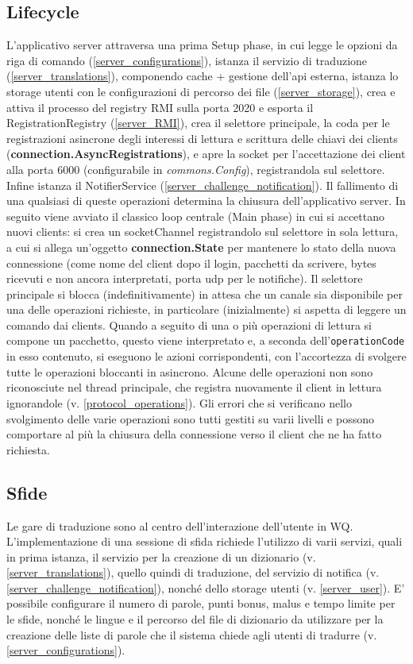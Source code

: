 \documentclass{article}
\begin{document}
    \subsection{Lifecycle}\label{server_lifecycle} L'applicativo server attraversa una prima Setup phase, in cui legge le opzioni da riga di comando (\ref{server_configurations}), istanza il servizio di traduzione (\ref{server_translations}), componendo cache + gestione dell'api esterna, istanza lo storage utenti con le configurazioni di percorso dei file (\ref{server_storage}), crea e attiva il processo del registry RMI sulla porta 2020 e esporta il RegistrationRegistry (\ref{server_RMI}), crea il selettore principale, la coda per le registrazioni asincrone degli interessi di lettura e scrittura delle chiavi dei clients (\textbf{connection.AsyncRegistrations}), e apre la socket per l'accettazione dei client alla porta 6000 (configurabile in \textit{commons.Config}), registrandola sul selettore. Infine istanza il NotifierService (\ref{server_challenge_notification}). Il fallimento di una qualsiasi di queste operazioni determina la chiusura dell'applicativo server.
    \newline In seguito viene avviato il classico loop centrale (Main phase) in cui si accettano nuovi clients: si crea un socketChannel registrandolo sul selettore in sola lettura, a cui si allega un'oggetto \textbf{connection.State} per mantenere lo stato della nuova connessione (come nome del client dopo il login, pacchetti da scrivere, bytes ricevuti e non ancora interpretati, porta udp per le notifiche). Il selettore principale si blocca (indefinitivamente) in attesa che un canale sia disponibile per una delle operazioni richieste, in particolare (inizialmente) si aspetta di leggere un comando dai clients. Quando a seguito di una o più operazioni di lettura si compone un pacchetto, questo viene interpretato e, a seconda dell'\texttt{operationCode} in esso contenuto, si eseguono le azioni corrispondenti, con l'accortezza di svolgere tutte le operazioni bloccanti in asincrono. Alcune delle operazioni non sono riconosciute nel thread principale, che registra nuovamente il client in lettura ignorandole (v. \ref{protocol_operations}). Gli errori che si verificano nello svolgimento delle varie operazioni sono tutti gestiti su varii livelli e possono comportare al più la chiusura della connessione verso il client che ne ha fatto richiesta.

    \subsection{Sfide}
    Le gare di traduzione sono al centro dell'interazione dell'utente in WQ. L'implementazione di una sessione di sfida richiede l'utilizzo di varii servizi, quali in prima istanza, il servizio per la creazione di un dizionario (v. \ref{server_translations}), quello quindi di traduzione, del servizio di notifica (v. \ref{server_challenge_notification}), nonché dello storage utenti (v. \ref{server_user}). E' possibile configurare il numero di parole, punti bonus, malus e tempo limite per le sfide, nonché le lingue e il percorso del file di dizionario da utilizzare per la creazione delle liste di parole che il sistema chiede agli utenti di tradurre (v. \ref{server_configurations}).
\end{document}
